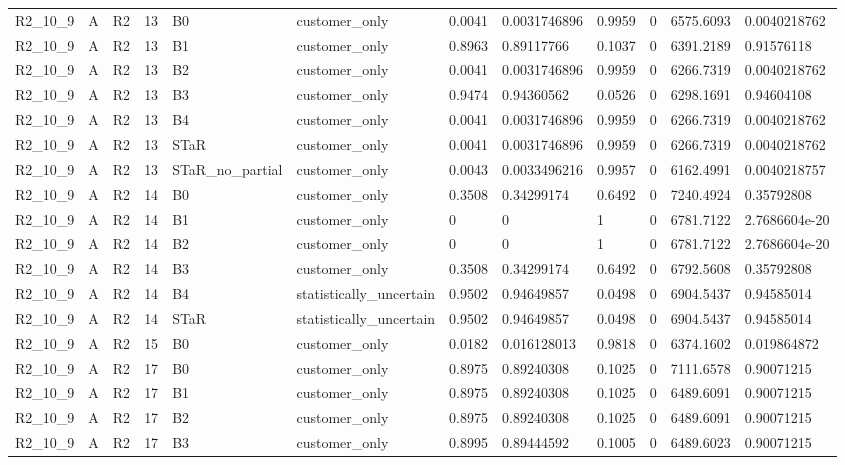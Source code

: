 \begin{longtable}{llllllllllll}
R2\_10\_9 & A & R2 & 13 & B0 & customer\_only & 0.0041 & 0.0031746896 & 0.9959 & 0 & 6575.6093 & 0.0040218762 \\
R2\_10\_9 & A & R2 & 13 & B1 & customer\_only & 0.8963 & 0.89117766 & 0.1037 & 0 & 6391.2189 & 0.91576118 \\
R2\_10\_9 & A & R2 & 13 & B2 & customer\_only & 0.0041 & 0.0031746896 & 0.9959 & 0 & 6266.7319 & 0.0040218762 \\
R2\_10\_9 & A & R2 & 13 & B3 & customer\_only & 0.9474 & 0.94360562 & 0.0526 & 0 & 6298.1691 & 0.94604108 \\
R2\_10\_9 & A & R2 & 13 & B4 & customer\_only & 0.0041 & 0.0031746896 & 0.9959 & 0 & 6266.7319 & 0.0040218762 \\
R2\_10\_9 & A & R2 & 13 & STaR & customer\_only & 0.0041 & 0.0031746896 & 0.9959 & 0 & 6266.7319 & 0.0040218762 \\
R2\_10\_9 & A & R2 & 13 & STaR\_no\_partial & customer\_only & 0.0043 & 0.0033496216 & 0.9957 & 0 & 6162.4991 & 0.0040218757 \\
R2\_10\_9 & A & R2 & 14 & B0 & customer\_only & 0.3508 & 0.34299174 & 0.6492 & 0 & 7240.4924 & 0.35792808 \\
R2\_10\_9 & A & R2 & 14 & B1 & customer\_only & 0 & 0 & 1 & 0 & 6781.7122 & 2.7686604e-20 \\
R2\_10\_9 & A & R2 & 14 & B2 & customer\_only & 0 & 0 & 1 & 0 & 6781.7122 & 2.7686604e-20 \\
R2\_10\_9 & A & R2 & 14 & B3 & customer\_only & 0.3508 & 0.34299174 & 0.6492 & 0 & 6792.5608 & 0.35792808 \\
R2\_10\_9 & A & R2 & 14 & B4 & statistically\_uncertain & 0.9502 & 0.94649857 & 0.0498 & 0 & 6904.5437 & 0.94585014 \\
R2\_10\_9 & A & R2 & 14 & STaR & statistically\_uncertain & 0.9502 & 0.94649857 & 0.0498 & 0 & 6904.5437 & 0.94585014 \\
R2\_10\_9 & A & R2 & 15 & B0 & customer\_only & 0.0182 & 0.016128013 & 0.9818 & 0 & 6374.1602 & 0.019864872 \\
R2\_10\_9 & A & R2 & 17 & B0 & customer\_only & 0.8975 & 0.89240308 & 0.1025 & 0 & 7111.6578 & 0.90071215 \\
R2\_10\_9 & A & R2 & 17 & B1 & customer\_only & 0.8975 & 0.89240308 & 0.1025 & 0 & 6489.6091 & 0.90071215 \\
R2\_10\_9 & A & R2 & 17 & B2 & customer\_only & 0.8975 & 0.89240308 & 0.1025 & 0 & 6489.6091 & 0.90071215 \\
R2\_10\_9 & A & R2 & 17 & B3 & customer\_only & 0.8995 & 0.89444592 & 0.1005 & 0 & 6489.6023 & 0.90071215 \\

\end{longtable}
